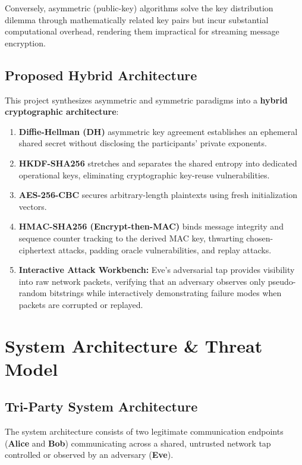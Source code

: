 \documentclass[11pt,a4paper]{article}
\begin{document}
Conversely, asymmetric (public-key) algorithms solve the key distribution dilemma through mathematically related key pairs but incur substantial computational overhead, rendering them impractical for streaming message encryption.

\subsection{Proposed Hybrid Architecture}
This project synthesizes asymmetric and symmetric paradigms into a \textbf{hybrid cryptographic architecture}:
\begin{enumerate}[leftmargin=1cm]
    \item \textbf{Diffie-Hellman (DH)} asymmetric key agreement establishes an ephemeral shared secret without disclosing the participants' private exponents.
    \item \textbf{HKDF-SHA256} stretches and separates the shared entropy into dedicated operational keys, eliminating cryptographic key-reuse vulnerabilities.
    \item \textbf{AES-256-CBC} secures arbitrary-length plaintexts using fresh initialization vectors.
    \item \textbf{HMAC-SHA256 (Encrypt-then-MAC)} binds message integrity and sequence counter tracking to the derived MAC key, thwarting chosen-ciphertext attacks, padding oracle vulnerabilities, and replay attacks.
    \item \textbf{Interactive Attack Workbench:} Eve's adversarial tap provides visibility into raw network packets, verifying that an adversary observes only pseudo-random bitstrings while interactively demonstrating failure modes when packets are corrupted or replayed.
\end{enumerate}

\section{System Architecture \& Threat Model}

\subsection{Tri-Party System Architecture}
The system architecture consists of two legitimate communication endpoints (\textbf{Alice} and \textbf{Bob}) communicating across a shared, untrusted network tap controlled or observed by an adversary (\textbf{Eve}).
\end{document}
